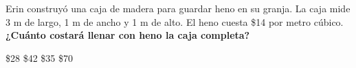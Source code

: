Erin construyó una caja de madera para guardar heno en su granja. La caja mide 3 m de largo, 1 m de ancho y 1 m de alto.
El heno cuesta \$14 por metro cúbico.
\textbf{¿Cuánto costará llenar con heno la caja completa?}\\


\begin{oneparchoices}
    \choice \$28
    \CorrectChoice \$42
    \choice \$35
    \choice \$70
\end{oneparchoices}
